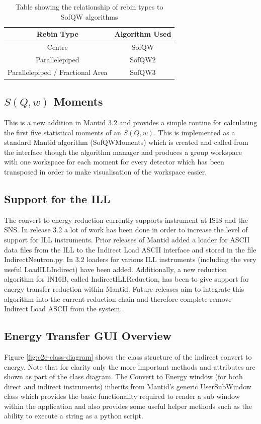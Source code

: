 \documentclass[paper=a4, fontsize=11pt]{scrartcl}	%
\numberwithin{equation}{section}															%
\numberwithin{figure}{section}																%
\numberwithin{table}{section}																%
\begin{document}
\begin{table}[H]
\begin{center}
\begin{tabular}{ c c}
Rebin Type & Algorithm Used \\ \hline
Centre & SofQW \\
Parallelepiped & SofQW2 \\
Parallelepiped / Fractional Area & SofQW3 \\
\end{tabular}
\caption{Table showing the relationship of rebin types to SofQW algorithms}
\label{table:sofqw-algorithms}
\end{center}
\end{table}

\subsection{$S(Q,w)$ Moments}
This is a new addition in Mantid 3.2 and provides a simple routine for calculating the first five statistical moments of an $S(Q,w)$. This is implemented as a standard Mantid algorithm (SofQWMoments) which is created and called from the interface though the algorithm manager and produces a group workspace with one workspace for each moment for every detector which has been transposed in order to make visualisation of the workspace easier.

\subsection{Support for the ILL}
The convert to energy reduction currently supports instrument at ISIS and the SNS. In release 3.2 a lot of work has been done in order to increase the level of support for ILL instruments. Prior releases of Mantid added a loader for ASCII data files from the ILL to the Indirect Load ASCII interface and stored in the file IndirectNeutron.py. In 3.2 loaders for various ILL instruments (including the very useful LoadILLIndirect) have been added. Additionally, a new reduction algorithm for IN16B, called IndirectILLReduction, has been to give support for energy transfer reduction within Mantid. Future releases aim to integrate this algorithm into the current reduction chain and therefore complete remove Indirect Load ASCII from the system.

\subsection{Energy Transfer GUI Overview}
Figure \ref{fig:c2e-class-diagram} shows the class structure of the indirect convert to energy. Note that for clarity only the more important methods and attributes are shown as part of the class diagram. The Convert to Energy window (for both direct and indirect instruments) inherits from Mantid's generic UserSubWindow class which provides the basic functionality required to render a sub window within the application and also provides some useful helper methods such as the ability to execute a string as a python script.
\end{document}
